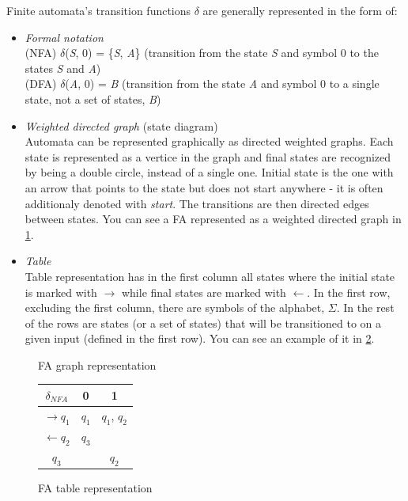 Finite automata's transition functions $\delta$ are generally represented in the form of:
\begin{itemize}
    \item \textit{Formal notation}\\
    (NFA) $\delta$(\textit{S}, 0) = \{\textit{S}, \textit{A}\} (transition from the state \textit{S} and symbol 0 to the states \textit{S} and \textit{A})\\
    (DFA) $\delta$(\textit{A}, 0) = \textit{B} (transition from the state \textit{A} and symbol 0 to a single state, not a set of states, \textit{B})
    \item \textit{Weighted directed graph} (state diagram)\\
    Automata can be represented graphically as directed weighted graphs. Each state is represented as a vertice in the graph and final states are recognized by being a double circle, instead of a single one. Initial state is the one with an arrow that points to the state but does not start anywhere - it is often additionaly denoted with \textit{start}. The transitions are then directed edges between states. You can see a FA represented as a weighted directed graph in \ref{graph-representation}.
    \item \textit{Table}\\
    Table representation has in the first column all states where the initial state is marked with $\rightarrow$ while final states are marked with $\leftarrow$. In the first row, excluding the first column, there are symbols of the alphabet, $\Sigma$. In the rest of the rows are states (or a set of states) that will be transitioned to on a given input (defined in the first row). You can see an example of it in \ref{table-representation}.
\end{itemize}
\begin{figure}
\caption{FA graph representation}\label{graph-representation}
\end{figure}
\begin{figure}
\begin{tabular}{||c|c|c||} 
    \hline
    $\delta_{NFA}$ & 0 & 1 \\ [0.5ex] 
    \hline\hline
    $\rightarrow \textit{q}_1$ & $\textit{q}_1$ & $\textit{q}_1$, $\textit{q}_2$ \\ 
    \hline
    $\leftarrow \textit{q}_2$ & $\textit{q}_3$ & \\
    \hline
    $\textit{q}_3$ &  & $\textit{q}_2$ \\
    \hline
\end{tabular}
\caption{FA table representation}\label{table-representation}
\end{figure}
